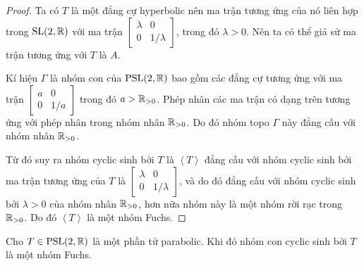 \begin{proof}
    Ta có $T$ là một đẳng cự hyperbolic nên ma trận tương ứng của nó liên hợp trong $\operatorname{SL}(2,\mathbb{R})$ với ma trận $\begin{bmatrix}
        \lambda & 0\\
        0 & 1/\lambda
    \end{bmatrix}$, trong đó $\lambda >0$.
    Nên ta có thể giả sử ma trận tương ứng với $T$ là $A$.
    
    Kí hiệu $\Gamma$ là nhóm con của $\operatorname{PSL}(2,\mathbb{R})$ bao gồm các đẳng cự tương ứng với ma trận $\begin{bmatrix}
        a & 0\\
        0 & 1/a
    \end{bmatrix}$ trong đó $ a > \mathbb{R}_{>0}$. Phép nhân các ma trận có dạng trên tương ứng với phép nhân trong nhóm nhân $\mathbb{R}_{>0}$. Do đó nhóm topo $\Gamma$ này đẳng cấu với nhóm nhân $\mathbb{R}_{>0}$.

    Từ đó suy ra nhóm cyclic sinh bởi $T$ là $\left<T\right>$ đẳng cấu với nhóm cyclic sinh bởi ma trận tương ứng của $T$ là $\begin{bmatrix}
        \lambda & 0\\
        0 & 1/\lambda
    \end{bmatrix}$, và do đó đẳng cấu với nhóm cyclic sinh bởi $\lambda >0$ của nhóm nhân $\mathbb{R}_{>0}$, hơn nữa nhóm này là một nhóm rời rạc trong $\mathbb{R}_{>0}$. Do đó $\left<T\right>$ là một nhóm Fuchs.
\end{proof}
\begin{prop}\label{prop 3.2.10}
    Cho $T \in \operatorname{PSL}(2,\mathbb{R})$ là một phần tử parabolic. Khi đó nhóm con cyclic sinh bởi $T$ là một nhóm Fuchs.
\end{prop}
